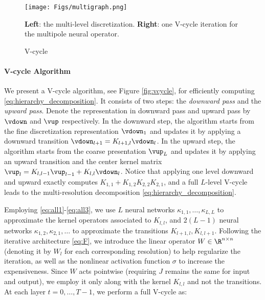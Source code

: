 \begin{figure}[t]
    {\centering
    \texttt{[image: Figs/multigraph.png]}
    \caption{V-cycle}\label{fig:vcycle}
    \label{fig:multigraph}
    \small{
    {\bf Left}: the multi-level discretization.  {\bf Right}: one V-cycle iteration for the multipole neural operator.
    }
    }
\end{figure}

\paragraph{V-cycle Algorithm}
We present a V-cycle algorithm, see Figure \ref{fig:vcycle}, for efficiently computing \eqref{eq:hierarchy_decomposition}. It consists of two steps: the \textit{downward pass} and the \textit{upward pass}. Denote the representation in downward pass and upward pass by $\vdown$ and $\vup$ respectively. In the downward step, the algorithm starts from the fine discretization representation $\vdown_1$ and updates it by applying a downward transition 
$\vdown_{l+1} = K_{l+1,l} \vdown_{l}$.
In the upward step, the algorithm starts from the coarse presentation $\vup_{L}$ and updates it by applying an upward transition and the center kernel matrix
$\vup_{l} = K_{l,l-1} \vup_{l-1} + K_{l,l} \vdown_l$. Notice that 
applying one level downward and upward exactly computes $K_{1,1} + K_{1,2}K_{2,2}K_{2,1}$, and a full $L$-level V-cycle leads to the multi-resolution decomposition \eqref{eq:hierarchy_decomposition}.

Employing \eqref{eq:all1}-\eqref{eq:all3}, we use $L$ neural networks $\kappa_{1,1}, \ldots, \kappa_{L,L}$ to approximate the kernel operators associated to $K_{l,l}$, and $2(L-1)$  neural networks $\kappa_{1,2}, \kappa_{2,1}, \dots$ to approximate the transitions  $K_{l+1,l}, K_{l,l+1}$.
Following the iterative architecture \eqref{eq:F}, we introduce the linear operator \(W \in \R^{n \times n}\)
(denoting it by \(W_l\) for each corresponding resolution) to help regularize the iteration, as well as the nonlinear activation function $\sigma$ to increase the expensiveness.  Since $W$ acts pointwise (requiring $J$ remains the same for input and output), we employ it only along with the kernel \(K_{l,l}\) and not the transitions. At each layer \(t=0,\dots,T-1\), we perform a full V-cycle as:


